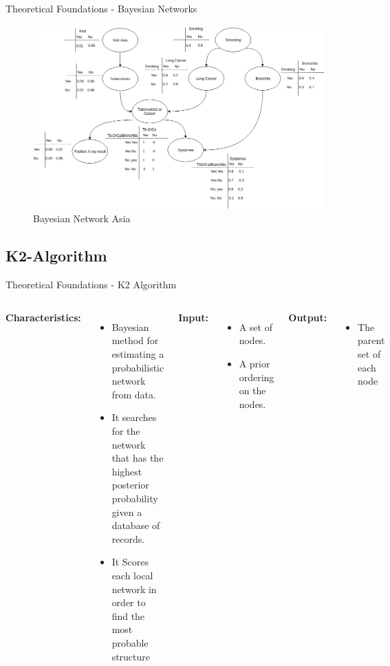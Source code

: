 \begin{frame}{Theoretical Foundations - Bayesian Networks}
    \begin{figure}[!h]
        \centering
        \includegraphics[scale=0.3]{figuras/asia_cpt.png}
        \caption{Bayesian Network Asia}
        \label{fig:asia}
    \end{figure}

\end{frame}



\subsection{K2-Algorithm}
\begin{frame}{Theoretical Foundations - K2 Algorithm}
\begin{columns}
        \textbf{Characteristics:}
        \begin{itemize}
            \item {Bayesian method for estimating a probabilistic network from data.}
            \item {It searches for the network that has the highest posterior probability given a database of records.}
            \item { It Scores each local network in order to find the most probable structure}
        \end{itemize}
        \textbf{Input:}
        \begin{itemize}
            \item A set of nodes.
            \item A prior ordering on the nodes.
        \end{itemize}
        \textbf{Output:}
        \begin{itemize}
            \item The parent set of each node
        \end{itemize}
\end{columns}
    
\end{frame}

